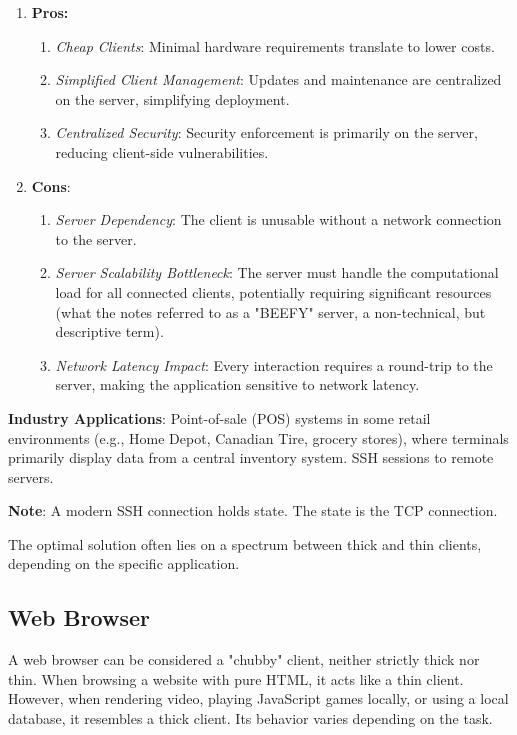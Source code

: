 \begin{enumerate}
\item \textbf{Pros:} 
\begin{enumerate}[itemsep=1pt]
	\item \textit{Cheap Clients}:  Minimal hardware requirements translate to lower costs.
	\item \textit{Simplified Client Management}: Updates and maintenance are centralized on the server, simplifying deployment.
	\item \textit{Centralized Security}: Security enforcement is primarily on the server, reducing client-side vulnerabilities.
\end{enumerate} 

\item \textbf{Cons}:
    \begin{enumerate}[itemsep=1pt]
        \item \textit{Server Dependency}:  The client is unusable without a network connection to the server.
        \item \textit{Server Scalability Bottleneck}: The server must handle the computational load for all connected clients, potentially requiring significant resources (what the notes referred to as a "BEEFY" server, a non-technical, but descriptive term).
        \item \textit{Network Latency Impact}: Every interaction requires a round-trip to the server, making the application sensitive to network latency.
    \end{enumerate}
\end{enumerate}
\textbf{Industry Applications}:  Point-of-sale (POS) systems in some retail environments (e.g., Home Depot, Canadian Tire, grocery stores), where terminals primarily display data from a central inventory system.  SSH sessions to remote servers.

\noindent \textbf{Note}: A modern SSH connection holds state. The state is the TCP connection.

\noindent The optimal solution often lies on a spectrum between thick and thin clients, depending on the specific application.

\subsection{Web Browser}

A web browser can be considered a "chubby" client, neither strictly thick nor thin. When browsing a website with pure HTML, it acts like a thin client. However, when rendering video, playing JavaScript games locally, or using a local database, it resembles a thick client.  Its behavior varies depending on the task.


